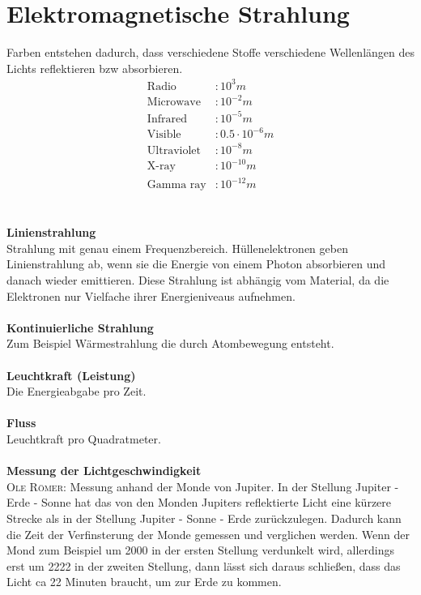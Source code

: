 \documentclass[a4paper,12pt]{article}
\begin{document}
\newpage

\section{Elektromagnetische Strahlung}
Farben entstehen dadurch, dass verschiedene Stoffe verschiedene Wellenlängen des Lichts reflektieren bzw absorbieren.
\begin{align*}
        \text{Radio}&:10^{3}m\\
        \text{Microwave}&:10^{-2}m\\
        \text{Infrared}&:10^{-5}m\\
        \text{Visible}&:0.5\cdot 10^{-6}m\\
        \text{Ultraviolet}&:10^{-8}m\\
        \text{X-ray}&:10^{-10}m\\
        \text{Gamma ray}&:10^{-12}m
\end{align*}
\\\hfill\\\textbf{Linienstrahlung}\\
Strahlung mit genau einem Frequenzbereich. Hüllenelektronen geben Linienstrahlung ab, wenn sie die Energie von einem Photon absorbieren und danach wieder emittieren. Diese Strahlung ist abhängig vom Material, da die Elektronen nur Vielfache ihrer Energieniveaus aufnehmen.
\\\hfill\\\textbf{Kontinuierliche Strahlung}\\ 
Zum Beispiel Wärmestrahlung die durch Atombewegung entsteht.
\\\hfill\\\textbf{Leuchtkraft (Leistung)}\\
Die Energieabgabe pro Zeit.
\\\hfill\\\textbf{Fluss}\\
Leuchtkraft pro Quadratmeter.
\\\hfill\\\textbf{Messung der Lichtgeschwindigkeit}\\ 
\textsc{Ole Römer}: Messung anhand der Monde von Jupiter. In der Stellung Jupiter - Erde - Sonne hat das von den Monden Jupiters reflektierte Licht eine kürzere Strecke als in der Stellung Jupiter - Sonne - Erde zurückzulegen. Dadurch kann die Zeit der Verfinsterung der Monde gemessen und verglichen werden. Wenn der Mond zum Beispiel um 2000 in der ersten Stellung verdunkelt wird, allerdings erst um 2222 in der zweiten Stellung, dann lässt sich daraus schließen, dass das Licht ca 22 Minuten braucht, um zur Erde zu kommen.
\end{document}
